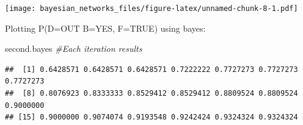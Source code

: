 \documentclass[
]{article}
\newenvironment{Shaded}{\begin{snugshade}}{\end{snugshade}}
\newcommand{\AttributeTok}[1]{\textcolor[rgb]{0.77,0.63,0.00}{#1}}
\newcommand{\CommentTok}[1]{\textcolor[rgb]{0.56,0.35,0.01}{\textit{#1}}}
\newcommand{\DecValTok}[1]{\textcolor[rgb]{0.00,0.00,0.81}{#1}}
\newcommand{\FunctionTok}[1]{\textcolor[rgb]{0.00,0.00,0.00}{#1}}
\newcommand{\NormalTok}[1]{#1}
\newcommand{\OtherTok}[1]{\textcolor[rgb]{0.56,0.35,0.01}{#1}}
\newcommand{\SpecialCharTok}[1]{\textcolor[rgb]{0.00,0.00,0.00}{#1}}
\newcommand{\StringTok}[1]{\textcolor[rgb]{0.31,0.60,0.02}{#1}}
\begin{document}
\begin{Shaded}
\end{Shaded}

\texttt{[image: bayesian\_networks\_files/figure-latex/unnamed-chunk-8-1.pdf]}

Plotting P(D=OUT \textbar{} B=YES, F=TRUE) using bayes:

\begin{Shaded}
\begin{Highlighting}[]
\NormalTok{second.bayes }\CommentTok{\#Each iteration results}
\end{Highlighting}
\end{Shaded}

\begin{verbatim}
##  [1] 0.6428571 0.6428571 0.6428571 0.7222222 0.7727273 0.7727273 0.7727273
##  [8] 0.8076923 0.8333333 0.8529412 0.8529412 0.8809524 0.8809524 0.9000000
## [15] 0.9000000 0.9074074 0.9193548 0.9242424 0.9324324 0.9324324
\end{verbatim}
\end{document}
